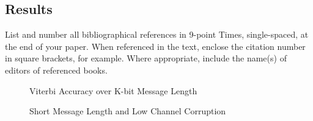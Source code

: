 \documentclass[10pt,twocolumn,letterpaper]{article}
\begin{document}
\subsection{Results}
List and number all bibliographical references in 9-point Times,
single-spaced, at the end of your paper. When referenced in the text,
enclose the citation number in square brackets, for
example.  Where appropriate, include the name(s) of
editors of referenced books.

\begin{figure}[t]
\begin{center}
\end{center}
   \caption{Viterbi Accuracy over K-bit Message Length}
\end{figure}


\begin{figure}[t]
\begin{center}
\end{center}
   \caption{Short Message Length and Low Channel Corruption}
\end{figure}
\end{document}
